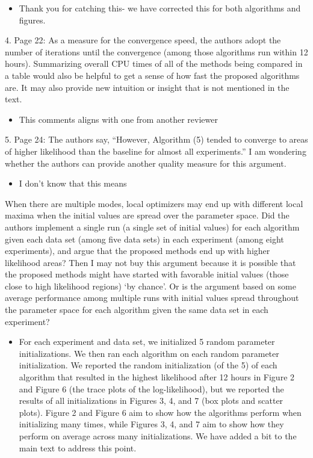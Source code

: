 \documentclass[11pt]{article}
\begin{document}
\begin{itemize}
    \item Thank you for catching this- we have corrected this for both algorithms and figures.
\end{itemize}

4. Page 22: As a measure for the convergence speed, the authors adopt the number of iterations until the convergence (among those algorithms run within 12 hours). Summarizing overall CPU times of all of the methods being compared in a table would also be helpful to get a sense of how fast the proposed algorithms are. It may also provide new intuition or insight that is not mentioned in the text.

\begin{itemize}
    \item This comments aligns with one from another reviewer
\end{itemize}

5. Page 24: The authors say, “However, Algorithm (5) tended to converge to areas of higher likelihood than the baseline for almost all experiments.” I am wondering whether the authors can provide another quality measure for this argument.

\begin{itemize}
    \item I don't know that this means
\end{itemize}

When there are multiple modes, local optimizers may end up with different local maxima when the initial values are spread over the parameter space. Did the authors implement a single run (a single set of initial values) for each algorithm given each data set (among five data sets) in each experiment (among eight experiments), and argue that the proposed methods end up with higher likelihood areas? Then I may not buy this argument because it is possible that the proposed methods might have started with favorable initial values (those close to high likelihood regions) ‘by chance’. Or is the argument based on some average performance among multiple runs with initial values spread throughout the parameter space for each algorithm given the same data set in each experiment?

\begin{itemize}
    \item For each experiment and data set, we initialized 5 random parameter initializations. We then ran each algorithm on each random parameter initialization. We reported the random initialization (of the 5) of each algorithm that resulted in the highest likelihood after 12 hours in Figure 2 and Figure 6 (the trace plots of the log-likelihood), but we reported the results of all initializations in Figures 3, 4, and 7 (box plots and scatter plots). Figure 2 and Figure 6 aim to show how the algorithms perform when initializing many times, while Figures 3, 4, and 7 aim to show how they perform on average across many initializations. We have added a bit to the main text to address this point.
\end{itemize} 
\end{document}
